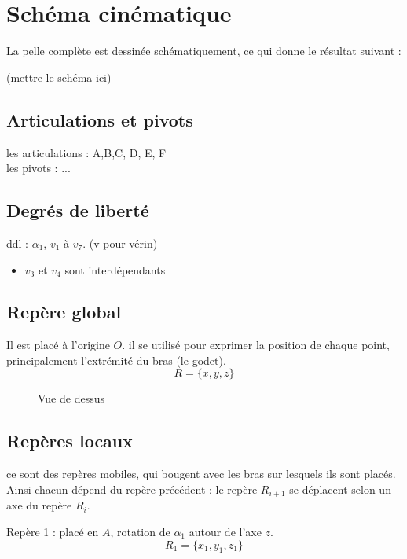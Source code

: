 \documentclass[12pt,a4paper]{article}
\begin{document}
\section{Schéma cinématique}
La pelle complète est dessinée schématiquement, ce qui donne le résultat suivant : 

(mettre le schéma ici)
\subsection{Articulations et pivots}
les articulations : A,B,C, D, E, F\\
les pivots : ...\\
\subsection{Degrés de liberté}
ddl : $\alpha_1$, $v_1$ à $v_7$. (v pour vérin)\\
\begin{itemize}
	\item $v_3$ et $v_4$ sont interdépendants
\end{itemize}

\subsection{Repère global}

Il est placé à l'origine $O$. il se utilisé pour exprimer la position de chaque point, principalement l'extrémité du bras (le godet).
\begin{equation}
R=\{x,y,z\}
\end{equation}
\medbreak
\medbreak

\begin{figure}[H]
	\centering
	\caption{Vue de dessus}
\end{figure}

\subsection{Repères locaux}
ce sont des repères mobiles, qui bougent avec les bras sur lesquels ils sont placés. Ainsi chacun dépend du repère précédent : le repère $R_{i+1}$ se déplacent selon un axe du repère $R_i$.
\medbreak

Repère 1 : placé en $A$, rotation de $\alpha_1$ autour de l'axe $z$.
\begin{equation}
R_1=\{x_1,y_1,z_1\}
\end{equation}
\end{document}
